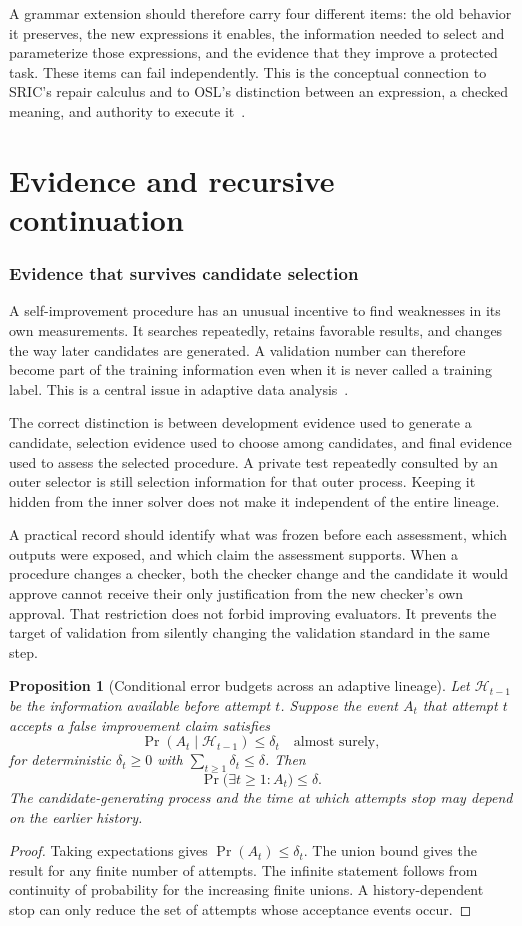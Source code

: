 \documentclass[11pt,letterpaper]{article}
\theoremstyle{plain}
\newtheorem{proposition}[theorem]{Proposition}
\theoremstyle{definition}
\begin{document}
A grammar extension should therefore carry four different items: the old behavior it preserves, the new expressions it enables, the information needed to select and parameterize those expressions, and the evidence that they improve a protected task. These items can fail independently. This is the conceptual connection to SRIC's repair calculus and to OSL's distinction between an expression, a checked meaning, and authority to execute it~\cite{sric,osl}.
\clearpage\part{Evidence and recursive continuation}
\section{Evidence that survives candidate selection}\label{sec:evidence}
A self-improvement procedure has an unusual incentive to find weaknesses in its own measurements. It searches repeatedly, retains favorable results, and changes the way later candidates are generated. A validation number can therefore become part of the training information even when it is never called a training label. This is a central issue in adaptive data analysis~\cite{dwork}.

The correct distinction is between development evidence used to generate a candidate, selection evidence used to choose among candidates, and final evidence used to assess the selected procedure. A private test repeatedly consulted by an outer selector is still selection information for that outer process. Keeping it hidden from the inner solver does not make it independent of the entire lineage.

A practical record should identify what was frozen before each assessment, which outputs were exposed, and which claim the assessment supports. When a procedure changes a checker, both the checker change and the candidate it would approve cannot receive their only justification from the new checker's own approval. That restriction does not forbid improving evaluators. It prevents the target of validation from silently changing the validation standard in the same step.

\begin{proposition}[Conditional error budgets across an adaptive lineage]\label{prop:lineage}
Let $\mathcal H_{t-1}$ be the information available before attempt $t$. Suppose the event $A_t$ that attempt $t$ accepts a false improvement claim satisfies
\[
\Pr(A_t\mid\mathcal H_{t-1})\leq\delta_t
\quad\text{almost surely},
\]
for deterministic $\delta_t\geq0$ with $\sum_{t\geq1}\delta_t\leq\delta$. Then
\[
\Pr\big(\exists t\geq1:A_t\big)\leq\delta.
\]
The candidate-generating process and the time at which attempts stop may depend on the earlier history.
\end{proposition}
\begin{proof}
Taking expectations gives $\Pr(A_t)\leq\delta_t$. The union bound gives the result for any finite number of attempts. The infinite statement follows from continuity of probability for the increasing finite unions. A history-dependent stop can only reduce the set of attempts whose acceptance events occur.
\end{proof}
\end{document}
